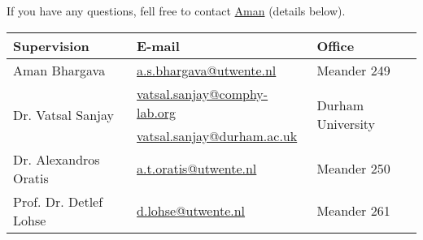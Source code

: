 \documentclass[a4paper,10pt]{article}
\begin{document}
If you have any questions, fell free to contact \href{mailto:a.s.bhargava@utwente.nl}{Aman} (details below).
\begin{center}
\begin{tabular}{|l|l|l|}
\hline \textbf{Supervision} & \textbf{E-mail} & \textbf{Office} \\
\hline Aman Bhargava & \href{mailto:a.s.bhargava@utwente.nl}{a.s.bhargava@utwente.nl} & Meander 249 \\
\hline \multirow{2}{*}{Dr. Vatsal Sanjay} & \href{mailto:vatsal.sanjay@comphy-lab.org}{vatsal.sanjay@comphy-lab.org} & \multirow{2}{*}{Durham University} \\
& \href{mailto:vatsal.sanjay@durham.ac.uk}{vatsal.sanjay@durham.ac.uk} & \\
\hline Dr. Alexandros Oratis   & \href{mailto:a.t.oratis@utwente.nl}{a.t.oratis@utwente.nl}& Meander 250 \\
\hline Prof. Dr. Detlef Lohse & \href{mailto:d.lohse@utwente.nl}{d.lohse@utwente.nl} & Meander 261  \\
\hline
\end{tabular}
\end{center}

\printbibliography
\end{document}
